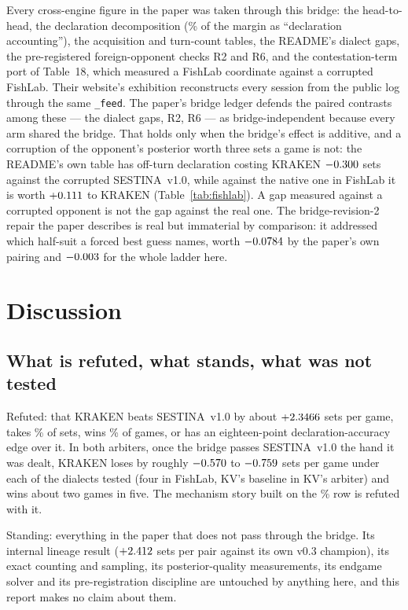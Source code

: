 \documentclass[11pt]{article}
\newcommand{\code}[1]{\texttt{#1}}
\newcommand{\sestina}{\mbox{SESTINA v1.0}}
\newcommand{\pct}{\%}
\begin{document}
Every cross-engine figure in the paper was taken through this bridge: the head-to-head, the
declaration decomposition (\kcPaperDeclShare\pct{} of the margin as ``declaration accounting''), the
acquisition and turn-count tables, the README's dialect gaps, the pre-registered foreign-opponent
checks R2 and R6, and the contestation-term port of Table~18, which measured a FishLab coordinate
against a corrupted FishLab. Their website's exhibition reconstructs every session from the public log
through the same \code{\_feed}. The paper's bridge ledger defends the paired contrasts among these
--- the dialect gaps, R2, R6 --- as bridge-independent because every arm shared the bridge. That holds
only when the bridge's effect is additive, and a corruption of the opponent's posterior worth three
sets a game is not: the README's own table has off-turn declaration costing KRAKEN $-0.300$
sets against the corrupted \sestina{}, while against the native one in FishLab it is worth
$+0.111$ to KRAKEN (Table~\ref{tab:fishlab}). A gap measured against a corrupted opponent is
not the gap against the real one. The bridge-revision-2 repair the paper describes is real but
immaterial by comparison: it addressed which half-suit a forced best guess names, worth
$-0.0784$ by the paper's own pairing and $-0.003$ for the whole ladder here.

\section{Discussion}
\label{sec:discussion}

\subsection{What is refuted, what stands, what was not tested}

Refuted: that KRAKEN beats \sestina{} by about $+2.3466$ sets per game, takes \kcMegaSetShare\pct{}
of sets, wins \kcMegaWin\pct{} of games, or has an eighteen-point declaration-accuracy edge over it.
In both arbiters, once the bridge passes \sestina{} the hand it was dealt, KRAKEN loses by roughly
$-0.570$ to $-0.759$ sets per game under each of the dialects tested (four in
FishLab, KV's baseline in KV's arbiter) and wins about two games in five. The
mechanism story built on the \kcMegaDeclS\pct{} row is refuted with it.

Standing: everything in the paper that does not pass through the bridge. Its internal lineage result
($+2.412$ sets per pair against its own v0.3 champion), its exact counting and
sampling, its posterior-quality measurements, its endgame solver and its pre-registration discipline
are untouched by anything here, and this report makes no claim about them.
\end{document}
